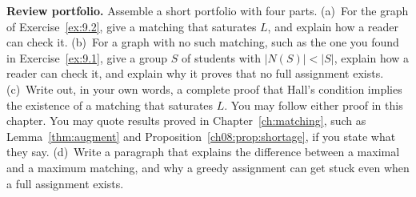 \begin{exercise}\label{ex:9.6}\textbf{Review portfolio.} Assemble a short portfolio with four parts.
(a)~For the graph of Exercise~\ref{ex:9.2}, give a matching that saturates $L$, and explain how a reader can check it.
(b)~For a graph with no such matching, such as the one you found in Exercise~\ref{ex:9.1}, give a group $S$ of students with $|N(S)|<|S|$, explain how a reader can check it, and explain why it proves that no full assignment exists.
(c)~Write out, in your own words, a complete proof that Hall's condition implies the existence of a matching that saturates $L$. You may follow either proof in this chapter. You may quote results proved in Chapter~\ref{ch:matching}, such as Lemma~\ref{thm:augment} and Proposition~\ref{ch08:prop:shortage}, if you state what they say.
(d)~Write a paragraph that explains the difference between a maximal and a maximum matching, and why a greedy assignment can get stuck even when a full assignment exists.\end{exercise}
